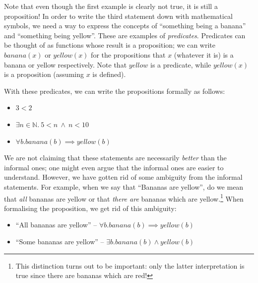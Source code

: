 \documentclass{tufte-handout}
\newcounter{example}
\begin{document}
\noindent
Note that even though the first example is clearly not true, it is
still a proposition!
%
In order to write the third statement down with mathematical
symbols, we need a way to express the concepts of ``something
being a banana'' and ``something being yellow''. These are
examples of \emph{predicates}. Predicates can be thought of as
functions whose result is a proposition; we can write
$\mathit{banana}(x)$ or $\mathit{yellow}(x)$ for the propositions
that $x$ (whatever it is) is a banana or yellow respectively. Note
that $\mathit{yellow}$ is a predicate, while $\mathit{yellow}(x)$
is a proposition (assuming $x$ is defined).


With these predicates, we can write the propositions formally as
follows:

\begin{itemize}
\item $3 < 2$
\item $\exists n \in \mathbb{N} .~ 5 < n ~\land~ n < 10$
\item $\forall b. \mathit{banana}(b) \implies \mathit{yellow}(b)$
\end{itemize}

\noindent
We are not claiming that these statements are necessarily
\emph{better} than the informal ones; one might even argue that
the informal ones are easier to understand. However, we have
gotten rid of some ambiguity from the informal statements.
%
For example, when we say that ``Bananas are yellow'', do we mean
that \emph{all} bananas are yellow or that \emph{there are}
bananas which are yellow.\footnote{This distinction turns out to be
  important: only the latter interpretation is true since there
  are bananas which are red!} When formalising the proposition,
we get rid of this ambiguity:

\begin{itemize}
\item ``All bananas are yellow'' -- $\forall b. \mathit{banana}(b) \implies \mathit{yellow}(b)$
\item ``Some bananas are yellow'' -- $\exists b. \mathit{banana}(b) \land \mathit{yellow}(b)$
\end{itemize}
\end{document}
